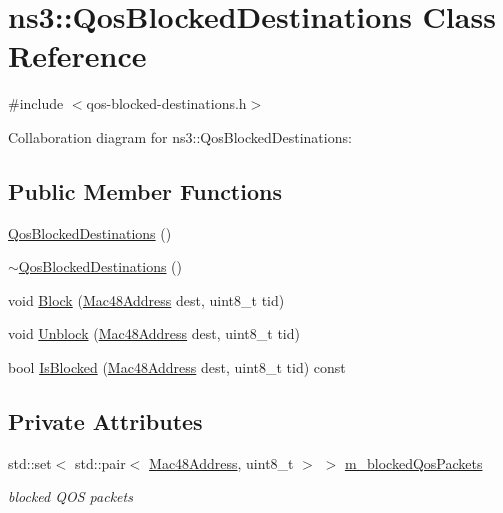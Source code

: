 \hypertarget{classns3_1_1QosBlockedDestinations}{}\section{ns3\+:\+:Qos\+Blocked\+Destinations Class Reference}
\label{classns3_1_1QosBlockedDestinations}


{\ttfamily \#include $<$qos-\/blocked-\/destinations.\+h$>$}



Collaboration diagram for ns3\+:\+:Qos\+Blocked\+Destinations\+:
\subsection*{Public Member Functions}
\begin{DoxyCompactItemize}
\item 
\hyperlink{classns3_1_1QosBlockedDestinations_acb0fb826baa02ac6663089045ebe87c2}{Qos\+Blocked\+Destinations} ()
\item 
\hyperlink{classns3_1_1QosBlockedDestinations_a21ff217488e9c53e402898b13a47abc9}{$\sim$\+Qos\+Blocked\+Destinations} ()
\item 
void \hyperlink{classns3_1_1QosBlockedDestinations_a8a419ab1d6732344d06c278de8e1cfd1}{Block} (\hyperlink{classns3_1_1Mac48Address}{Mac48\+Address} dest, uint8\+\_\+t tid)
\item 
void \hyperlink{classns3_1_1QosBlockedDestinations_a7f99916eabf1921bfbf14ca9f2ee24aa}{Unblock} (\hyperlink{classns3_1_1Mac48Address}{Mac48\+Address} dest, uint8\+\_\+t tid)
\item 
bool \hyperlink{classns3_1_1QosBlockedDestinations_a48ae04ccd20f510ad7b9c88fe319255c}{Is\+Blocked} (\hyperlink{classns3_1_1Mac48Address}{Mac48\+Address} dest, uint8\+\_\+t tid) const 
\end{DoxyCompactItemize}
\subsection*{Private Attributes}
\begin{DoxyCompactItemize}
\item 
std\+::set$<$ std\+::pair$<$ \hyperlink{classns3_1_1Mac48Address}{Mac48\+Address}, uint8\+\_\+t $>$ $>$ \hyperlink{classns3_1_1QosBlockedDestinations_ad1cabb745db1b65e837d4f8725eff9ec}{m\+\_\+blocked\+Qos\+Packets}
\begin{DoxyCompactList}\small\item\em blocked Q\+OS packets \end{DoxyCompactList}\end{DoxyCompactItemize}


